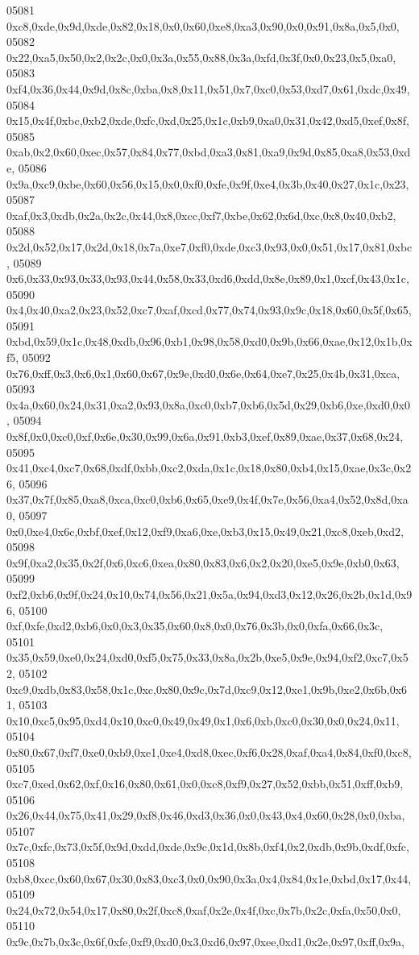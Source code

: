 \begin{DoxyCode}
05081   0xc8,0xde,0x9d,0xde,0x82,0x18,0x0,0x60,0xe8,0xa3,0x90,0x0,0x91,0x8a,0x5,0x0,
05082   0x22,0xa5,0x50,0x2,0x2c,0x0,0x3a,0x55,0x88,0x3a,0xfd,0x3f,0x0,0x23,0x5,0xa0,
05083   0xf4,0x36,0x44,0x9d,0x8c,0xba,0x8,0x11,0x51,0x7,0xc0,0x53,0xd7,0x61,0xdc,0x49,
05084   0x15,0x4f,0xbc,0xb2,0xde,0xfc,0xd,0x25,0x1c,0xb9,0xa0,0x31,0x42,0xd5,0xef,0x8f,
05085   0xab,0x2,0x60,0xec,0x57,0x84,0x77,0xbd,0xa3,0x81,0xa9,0x9d,0x85,0xa8,0x53,0xde,
05086   0x9a,0xc9,0xbe,0x60,0x56,0x15,0x0,0xf0,0xfe,0x9f,0xe4,0x3b,0x40,0x27,0x1c,0x23,
05087   0xaf,0x3,0xdb,0x2a,0x2c,0x44,0x8,0xcc,0xf7,0xbe,0x62,0x6d,0xc,0x8,0x40,0xb2,
05088   0x2d,0x52,0x17,0x2d,0x18,0x7a,0xe7,0xf0,0xde,0xc3,0x93,0x0,0x51,0x17,0x81,0xbc,
05089   0x6,0x33,0x93,0x33,0x93,0x44,0x58,0x33,0xd6,0xdd,0x8e,0x89,0x1,0xcf,0x43,0x1c,
05090   0x4,0x40,0xa2,0x23,0x52,0xc7,0xaf,0xcd,0x77,0x74,0x93,0x9c,0x18,0x60,0x5f,0x65,
05091   0xbd,0x59,0x1c,0x48,0xdb,0x96,0xb1,0x98,0x58,0xd0,0x9b,0x66,0xae,0x12,0x1b,0xf5,
05092   0x76,0xff,0x3,0x6,0x1,0x60,0x67,0x9e,0xd0,0x6e,0x64,0xe7,0x25,0x4b,0x31,0xca,
05093   0x4a,0x60,0x24,0x31,0xa2,0x93,0x8a,0xc0,0xb7,0xb6,0x5d,0x29,0xb6,0xe,0xd0,0x0,
05094   0x8f,0x0,0xc0,0xf,0x6e,0x30,0x99,0x6a,0x91,0xb3,0xef,0x89,0xae,0x37,0x68,0x24,
05095   0x41,0xc4,0xc7,0x68,0xdf,0xbb,0xc2,0xda,0x1c,0x18,0x80,0xb4,0x15,0xae,0x3c,0x26,
05096   0x37,0x7f,0x85,0xa8,0xca,0xc0,0xb6,0x65,0xe9,0x4f,0x7e,0x56,0xa4,0x52,0x8d,0xa0,
05097   0x0,0xe4,0x6c,0xbf,0xef,0x12,0xf9,0xa6,0xe,0xb3,0x15,0x49,0x21,0xc8,0xeb,0xd2,
05098   0x9f,0xa2,0x35,0x2f,0x6,0xc6,0xea,0x80,0x83,0x6,0x2,0x20,0xe5,0x9e,0xb0,0x63,
05099   0xf2,0xb6,0x9f,0x24,0x10,0x74,0x56,0x21,0x5a,0x94,0xd3,0x12,0x26,0x2b,0x1d,0x96,
05100   0xf,0xfe,0xd2,0xb6,0x0,0x3,0x35,0x60,0x8,0x0,0x76,0x3b,0x0,0xfa,0x66,0x3c,
05101   0x35,0x59,0xe0,0x24,0xd0,0xf5,0x75,0x33,0x8a,0x2b,0xe5,0x9e,0x94,0xf2,0xc7,0x52,
05102   0xc9,0xdb,0x83,0x58,0x1c,0xc,0x80,0x9c,0x7d,0xc9,0x12,0xe1,0x9b,0xe2,0x6b,0x61,
05103   0x10,0xc5,0x95,0xd4,0x10,0xc0,0x49,0x49,0x1,0x6,0xb,0xc0,0x30,0x0,0x24,0x11,
05104   0x80,0x67,0xf7,0xe0,0xb9,0xe1,0xe4,0xd8,0xec,0xf6,0x28,0xaf,0xa4,0x84,0xf0,0xc8,
05105   0xc7,0xed,0x62,0xf,0x16,0x80,0x61,0x0,0xc8,0xf9,0x27,0x52,0xbb,0x51,0xff,0xb9,
05106   0x26,0x44,0x75,0x41,0x29,0xf8,0x46,0xd3,0x36,0x0,0x43,0x4,0x60,0x28,0x0,0xba,
05107   0x7c,0xfc,0x73,0x5f,0x9d,0xdd,0xde,0x9c,0x1d,0x8b,0xf4,0x2,0xdb,0x9b,0xdf,0xfc,
05108   0xb8,0xcc,0x60,0x67,0x30,0x83,0xc3,0x0,0x90,0x3a,0x4,0x84,0x1e,0xbd,0x17,0x44,
05109   0x24,0x72,0x54,0x17,0x80,0x2f,0xc8,0xaf,0x2e,0x4f,0xc,0x7b,0x2c,0xfa,0x50,0x0,
05110   0x9c,0x7b,0x3c,0x6f,0xfe,0xf9,0xd0,0x3,0xd6,0x97,0xee,0xd1,0x2e,0x97,0xff,0x9a,

\end{DoxyCode}
